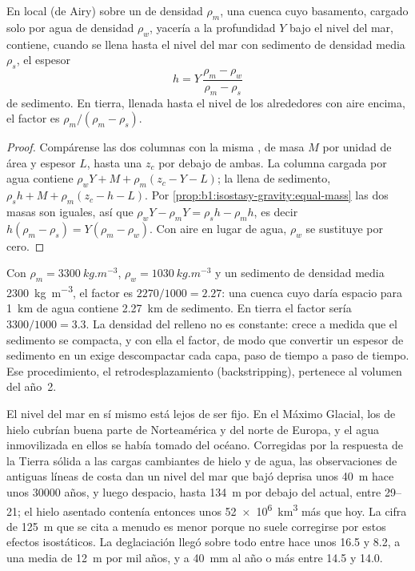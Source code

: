 \begin{proposition}\label{prop:b1:diagenesis-basins:loading}
En  local (de Airy) sobre un  de densidad $\rho_m$, una cuenca cuyo basamento, cargado solo por agua de densidad $\rho_w$, yacería a la profundidad $Y$
bajo el nivel del mar, contiene, cuando se llena hasta el nivel del mar con sedimento de densidad media
$\rho_s$, el espesor
\[
  h = Y\,\frac{\rho_m - \rho_w}{\rho_m - \rho_s}
\]
de sedimento. En tierra, llenada hasta el nivel de los alrededores con aire encima, el factor es $\rho_m/(\rho_m - \rho_s)$.
\end{proposition}

\begin{proof}
Compárense las dos columnas con la misma , de masa $M$ por unidad de área y espesor $L$, hasta una  $z_c$ por debajo de ambas. La columna cargada por agua
contiene $\rho_w Y + M + \rho_m(z_c - Y - L)$; la llena de sedimento, $\rho_s h + M + \rho_m(z_c - h - L)$. Por
\cref{prop:b1:isostasy-gravity:equal-mass} las dos masas son iguales, así que
$\rho_w Y - \rho_m Y = \rho_s h - \rho_m h$, es decir $h(\rho_m - \rho_s) =
Y(\rho_m - \rho_w)$. Con aire en lugar de agua, $\rho_w$ se sustituye por cero.
\end{proof}

Con $\rho_m = \qty{3300}{kg.m^{-3}}$, $\rho_w = \qty{1030}{kg.m^{-3}}$ y un sedimento de densidad media \qty{2300}{kg.m^{-3}}, el factor es
$2270/1000 = \num{2.27}$: una cuenca cuyo  daría espacio para \qty{1}{km} de agua contiene \qty{2.27}{km} de sedimento. En tierra el factor sería
$3300/1000 = \num{3.3}$. La densidad del relleno no es constante: crece a medida que el sedimento se compacta, y con ella el factor, de modo que convertir un espesor de sedimento
en un  exige descompactar cada capa, paso de tiempo a paso de tiempo. Ese procedimiento, el retrodesplazamiento (backstripping), pertenece al volumen del año~2.

El nivel del mar en sí mismo está lejos de ser fijo. En el Máximo Glacial, los  de hielo cubrían buena parte de Norteamérica y del norte de Europa, y el agua inmovilizada en ellos se había
tomado del océano. Corregidas por la respuesta de la Tierra sólida a las cargas cambiantes de hielo y de agua, las observaciones de antiguas líneas de costa dan un nivel del mar que bajó deprisa
unos \qty{40}{m} hace unos \num{30000} años, y luego despacio, hasta \qty{134}{m} por debajo del actual, entre \qtyrange{29}{21}{\ka}; el hielo asentado contenía entonces unos \qty{52e6}{km^3} más que hoy.
La cifra de \qty{125}{m} que se cita a menudo es menor porque no suele corregirse por estos efectos isostáticos. La deglaciación llegó sobre todo entre hace unos \qty{16.5}{\ka} y \qty{8.2}{\ka}, a una media de
\qty{12}{m} por mil años, y a \qty{40}{mm} al año o más entre \qty{14.5}{\ka} y \qty{14.0}{\ka}.

